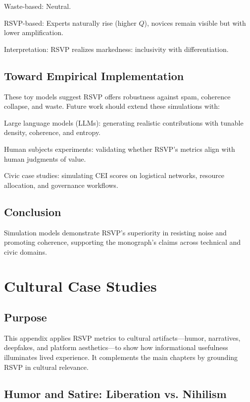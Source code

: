 \documentclass{book}
\begin{document}
Waste-based: Neutral.

RSVP-based: Experts naturally rise (higher \( Q \)), novices remain visible but with lower amplification.

Interpretation: RSVP realizes markedness: inclusivity with differentiation.

\section{Toward Empirical Implementation}

These toy models suggest RSVP offers robustness against spam, coherence collapse, and waste. Future work should extend these simulations with:

Large language models (LLMs): generating realistic contributions with tunable density, coherence, and entropy.

Human subjects experiments: validating whether RSVP’s metrics align with human judgments of value.

Civic case studies: simulating CEI scores on logistical networks, resource allocation, and governance workflows.

\section{Conclusion}

Simulation models demonstrate RSVP’s superiority in resisting noise and promoting coherence, supporting the monograph’s claims across technical and civic domains.

\chapter{Cultural Case Studies}

\section{Purpose}

This appendix applies RSVP metrics to cultural artifacts—humor, narratives, deepfakes, and platform aesthetics—to show how informational usefulness illuminates lived experience. It complements the main chapters by grounding RSVP in cultural relevance.

\section{Humor and Satire: Liberation vs. Nihilism}
\end{document}
